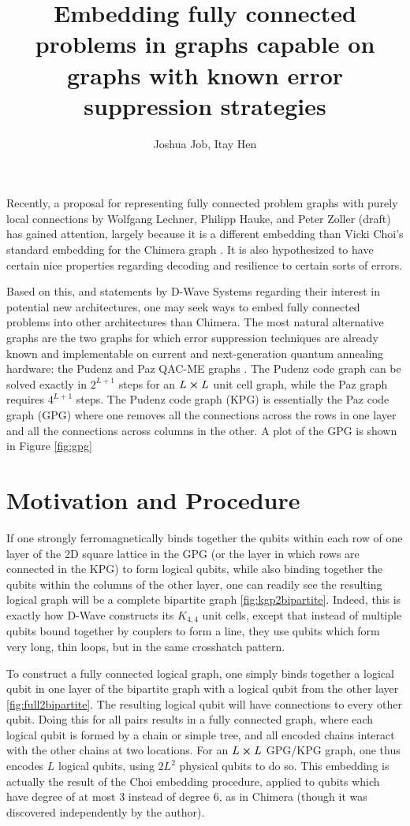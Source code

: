 \documentclass[superscriptaddress,showpacs,reprint]{revtex4-1}
\begin{document}
\title{Embedding fully connected problems in graphs capable on graphs with known error suppression strategies}
\author{Joshua Job, Itay Hen}
\maketitle

Recently, a proposal for representing fully connected problem graphs with purely local connections by Wolfgang Lechner, Philipp Hauke, and Peter Zoller (draft) has gained attention, largely because it is a different embedding than Vicki Choi's standard embedding for the Chimera graph \cite{Choi1,Choi2}. It is also hypothesized to have certain nice properties regarding decoding and resilience to certain sorts of errors.

Based on this, and statements by D-Wave Systems regarding their interest in potential new architectures, one may seek ways to embed fully connected problems into other architectures than Chimera. The most natural alternative graphs are the two graphs for which error suppression techniques are already known and implementable on current and next-generation quantum annealing hardware: the Pudenz and Paz QAC-ME graphs \cite{PAL:14,Vinci:2015um}. The Pudenz code graph can be solved exactly in $2^{L+1}$ steps for an $L\cross L$ unit cell graph, while the Paz graph requires $4^{L+1}$ steps. The Pudenz code graph (KPG) is essentially the Paz code graph (GPG) where one removes all the connections across the rows in one layer and all the connections across columns in the other. A plot of the GPG is shown in Figure \ref{fig:gpg}
\section{Motivation and Procedure}
If one strongly ferromagnetically binds together the qubits within each row of one layer of the 2D square lattice in the GPG (or the layer in which rows are connected in the KPG) to form logical qubits, while also binding together the qubits within the columns of the other layer, one can readily see the resulting logical graph will be a complete bipartite graph \ref{fig:kgp2bipartite}. Indeed, this is exactly how D-Wave constructs its $K_{4,4}$ unit cells, except that instead of multiple qubits bound together by couplers to form a line, they use qubits which form very long, thin loops, but in the same crosshatch pattern.

To construct a fully connected logical graph, one simply binds together a logical qubit in one layer of the bipartite graph with a logical qubit from the other layer \ref{fig:full2bipartite}. The resulting logical qubit will have connections to every other qubit. Doing this for all pairs results in a fully connected graph, where each logical qubit is formed by a chain or simple tree, and all encoded chains interact with the other chains at two locations. For an $L\cross L$ GPG/KPG graph, one thus encodes $L$ logical qubits, using $2L^2$ physical qubits to do so. This embedding is actually the result of the Choi embedding procedure, applied to qubits which have degree of at most $3$ instead of degree $6$, as in Chimera (though it was discovered independently by the author).
\end{document}
